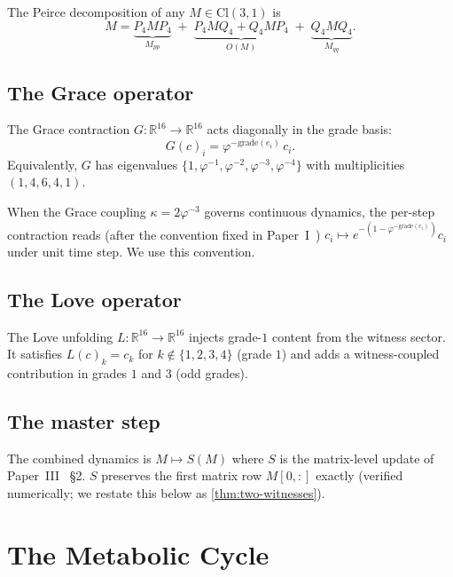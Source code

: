 \documentclass[11pt,a4paper]{article}
\theoremstyle{plain}
\theoremstyle{definition}
\theoremstyle{remark}
\numberwithin{equation}{section}
\providecommand{\Cl}{\mathrm{Cl}}
\providecommand{\R}{\mathbb{R}}
\providecommand{\vp}{\varphi}
\providecommand{\Pf}{P_4}
\providecommand{\Qf}{Q_4}
\begin{document}
The Peirce decomposition of any $M \in \Cl(3,1)$ is
\begin{equation}
\label{eq:peirce}
M = \underbrace{\Pf M \Pf}_{M_{pp}} \;+\; \underbrace{\Pf M \Qf + \Qf M \Pf}_{O(M)} \;+\; \underbrace{\Qf M \Qf}_{M_{qq}}.
\end{equation}

\subsection{The Grace operator}

The Grace contraction $G : \R^{16} \to \R^{16}$ acts diagonally in
the grade basis:
\begin{equation}
\label{eq:grace}
G(c)_i = \vp^{-\mathrm{grade}(e_i)} \, c_i.
\end{equation}
Equivalently, $G$ has eigenvalues $\{1, \vp^{-1}, \vp^{-2}, \vp^{-3}, \vp^{-4}\}$
with multiplicities $(1, 4, 6, 4, 1)$.

When the Grace coupling $\kappa = 2\vp^{-3}$ governs continuous
dynamics, the per-step contraction reads (after the convention
fixed in Paper~I~\cite{paper-I}) $c_i \mapsto e^{-(1 - \vp^{-\mathrm{grade}(e_i)})} c_i$
under unit time step. We use this convention.

\subsection{The Love operator}

The Love unfolding $L : \R^{16} \to \R^{16}$ injects grade-$1$
content from the witness sector. It satisfies $L(c)_k = c_k$ for
$k \notin \{1,2,3,4\}$ (grade $1$) and adds a witness-coupled
contribution in grades $1$ and $3$ (odd grades).

\subsection{The master step}

The combined dynamics is $M \mapsto S(M)$ where $S$ is the
matrix-level update of Paper~III~\cite{paper-III} \S2. $S$ preserves the first matrix
row $M[0, {:}]$ exactly (verified numerically; we restate this
below as \cref{thm:two-witnesses}).

\section{The Metabolic Cycle}
\label{sec:cycle}
\end{document}

